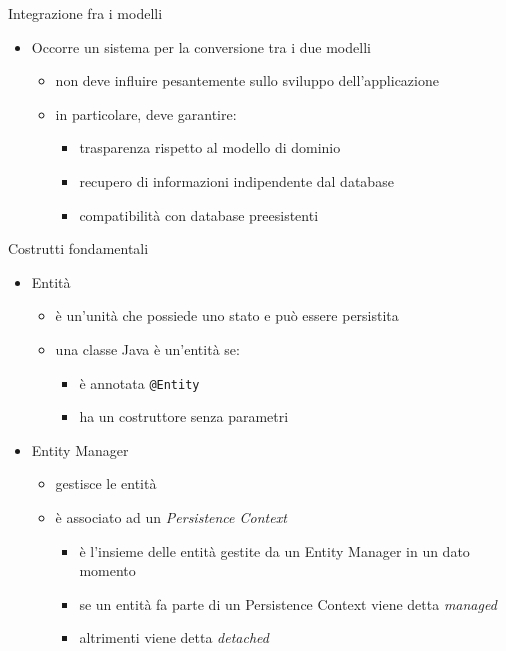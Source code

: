 \begin{frame}{Integrazione fra i modelli}

\begin{itemize}
\item Occorre un sistema per la conversione tra i due modelli

	\begin{itemize}
	\item non deve influire pesantemente sullo sviluppo dell'applicazione
	\item in particolare, deve garantire:
	
		\begin{itemize}
		\item trasparenza rispetto al modello di dominio
		\item recupero di informazioni indipendente dal database
		\item compatibilità con database preesistenti
		\end{itemize}
	
	\end{itemize}

\end{itemize}

\end{frame}


\begin{frame}{Costrutti fondamentali}

\begin{itemize}
\item Entità
	\begin{itemize}
	\item è un'unità che possiede uno stato e può essere persistita
	\item una classe Java è un'entità se:
		\begin{itemize}
		\item è annotata \texttt{@Entity}
		\item ha un costruttore senza parametri
		\end{itemize}
	\end{itemize}

\item Entity Manager
	\begin{itemize}
	\item gestisce le entità
	\item è associato ad un \textsl{Persistence Context}
		\begin{itemize}
		\item è l'insieme delle entità gestite da un Entity Manager in un dato momento
		\item se un entità fa parte di un Persistence Context viene detta \textsl{managed}
		\item altrimenti viene detta \textsl{detached}
		\end{itemize}
	\end{itemize}

\end{itemize}	


\end{frame}


